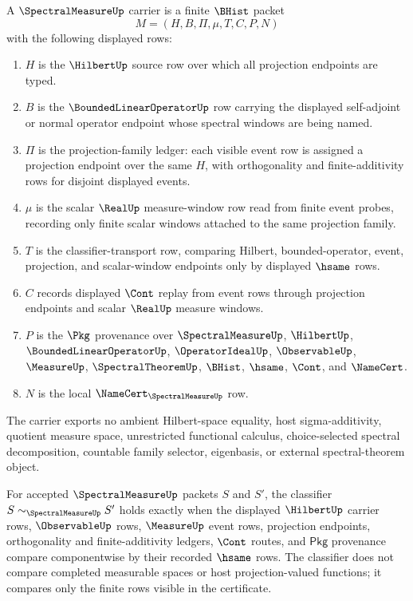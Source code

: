 \begin{definition}
\label{def:spectralmeasure-carrier}
\label{def:spectral-measure-carrier}
A $\SpectralMeasureUp$ carrier is a finite $\BHist$ packet
$$
M=(H,B,\Pi,\mu,T,C,P,N)
$$
with the following displayed rows:
\begin{enumerate}
\item $H$ is the $\HilbertUp$ source row over which all projection endpoints are typed.
\item $B$ is the $\BoundedLinearOperatorUp$ row carrying the displayed self-adjoint or normal operator endpoint whose spectral windows are being named.
\item $\Pi$ is the projection-family ledger: each visible event row is assigned a projection endpoint over the same $H$, with orthogonality and finite-additivity rows for disjoint displayed events.
\item $\mu$ is the scalar $\RealUp$ measure-window row read from finite event probes, recording only finite scalar windows attached to the same projection family.
\item $T$ is the classifier-transport row, comparing Hilbert, bounded-operator, event, projection, and scalar-window endpoints only by displayed $\hsame$ rows.
\item $C$ records displayed $\Cont$ replay from event rows through projection endpoints and scalar $\RealUp$ measure windows.
\item $P$ is the $\Pkg$ provenance over $\SpectralMeasureUp$, $\HilbertUp$, $\BoundedLinearOperatorUp$, $\OperatorIdealUp$, $\ObservableUp$, $\MeasureUp$, $\SpectralTheoremUp$, $\BHist$, $\hsame$, $\Cont$, and $\NameCert$.
\item $N$ is the local $\NameCert_{\SpectralMeasureUp}$ row.
\end{enumerate}

The carrier exports no ambient Hilbert-space equality, host sigma-additivity, quotient measure space, unrestricted functional calculus, choice-selected spectral decomposition, countable family selector, eigenbasis, or external spectral-theorem object.
\end{definition}

\begin{definition}
\label{def:spectralmeasure-classifier}
For accepted $\SpectralMeasureUp$ packets $S$ and $S'$, the classifier $S\sim_{\SpectralMeasureUp}S'$ holds exactly when the displayed $\HilbertUp$ carrier rows, $\ObservableUp$ rows, $\MeasureUp$ event rows, projection endpoints, orthogonality and finite-additivity ledgers, $\Cont$ routes, and $\mathsf{Pkg}$ provenance compare componentwise by their recorded $\hsame$ rows. The classifier does not compare completed measurable spaces or host projection-valued functions; it compares only the finite rows visible in the certificate.
\end{definition}

